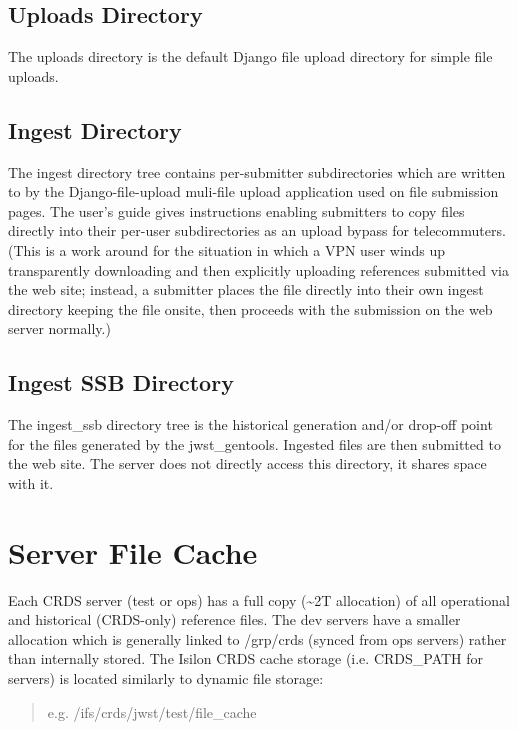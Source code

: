 \documentclass[letterpaper,10pt,english]{sphinxmanual}
\begin{document}
\subsection{Uploads Directory}
\label{server_guide:uploads-directory}
The uploads directory is the default Django file upload directory for simple file uploads.


\subsection{Ingest Directory}
\label{server_guide:ingest-directory}
The ingest directory tree contains per-submitter subdirectories which are written to by the Django-file-upload
muli-file upload application used on file submission pages.  The user's guide gives instructions enabling submitters
to copy files directly into their per-user subdirectories as an upload bypass for telecommuters.  (This is a work
around for the situation in which a VPN user winds up transparently downloading and then explicitly uploading
references submitted via the web site;  instead,  a submitter places the file directly into their own ingest
directory keeping the file onsite,  then proceeds with the submission on the web server normally.)


\subsection{Ingest SSB Directory}
\label{server_guide:ingest-ssb-directory}
The ingest\_ssb directory tree is the historical generation and/or drop-off point for the files generated by the
jwst\_gentools.   Ingested files are then submitted to the web site.   The server does not directly access this
directory,  it shares space with it.


\section{Server File Cache}
\label{server_guide:server-file-cache}
Each CRDS server (test or ops) has a full copy (\textasciitilde{}2T allocation) of all operational and historical (CRDS-only)
reference files.   The dev servers have a smaller allocation which is generally linked to /grp/crds
(synced from ops servers) rather than internally stored.  The Isilon CRDS cache storage (i.e. CRDS\_PATH for servers)
is located similarly to dynamic file storage:
\begin{quote}

e.g. /ifs/crds/jwst/test/file\_cache
\end{quote}
\end{document}
